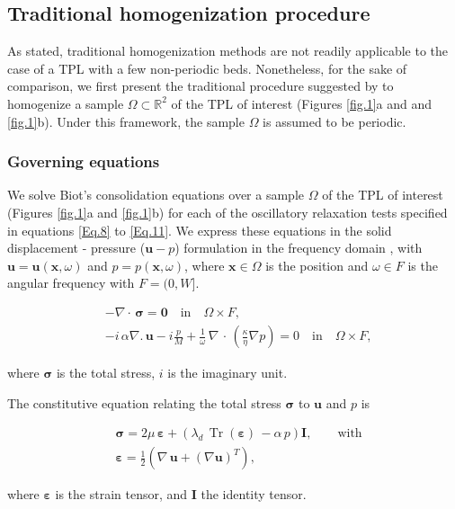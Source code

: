 \documentclass[draft]{agujournal2019}
\DeclareMathOperator{\tr}{Tr}
\begin{document}
\subsection{Traditional homogenization procedure}
As stated, traditional homogenization methods are not readily applicable to the case of a TPL with a few non-periodic beds. Nonetheless, for the sake of comparison, we first present the traditional procedure suggested by  
to homogenize a sample $\Omega \subset \mathbb R^2$ of the TPL of interest (Figures \ref{fig.1}a and and \ref{fig.1}b). Under this framework, the sample $\Omega$ is assumed to be periodic. 

\subsubsection{Governing equations}
We solve Biot's consolidation equations \cite{Biot1941, Biot1962} over a sample  $\Omega$ of the TPL of interest (Figures \ref{fig.1}a and \ref{fig.1}b) for each of the oscillatory relaxation tests specified in equations
\eqref{Eq.8} to \eqref{Eq.11}. We express these equations in the solid displacement - pressure ($\bm{u}-p$) formulation in the frequency domain \cite{Quintal2011,Favino2020},  with $\bm{u} = \bm{u}(\bm{x}, \omega)$ and $p = p(\bm{x},\omega)$, where $\bm{x} \in \Omega$ is the position  and $\omega \in F$ is the angular frequency with $F =(0,W]$. 
\begin{linenomath*}
\begin{equation}\label{Eq.6}
\begin{split}
& - \nabla \cdot \, \bm{\sigma} = \bm{0}  \quad  \textrm{in} \quad \Omega \times F,  \\
& - i \, \alpha \nabla . \, \bm{u} -i \frac{p}{M} + \frac{1}{\omega} \,\nabla \, \cdot \, \left( \frac{\kappa}{\eta} \nabla p\right)  =0 \quad  \textrm{in} \quad \Omega \times F,
\end{split}
\end{equation}
\end{linenomath*}
where $\bm{\sigma}$ is the total stress, $i$ is the imaginary unit.

The constitutive equation relating the total stress $\bm{\sigma}$ to $\bm{u}$ and $p$ is
\begin{linenomath*}
\begin{equation}\label{Eq.7}
\begin{split}
& \bm{\sigma} =  2\mu \, \bm{\varepsilon} +  \left( \lambda_d \,  \tr( \bm{\varepsilon})\, - \alpha \,p \right) \bm{I}, \qquad \text{with}\\
& \bm{\varepsilon} = \frac{1}{2} \left( \nabla \,\bm{u} + ({\nabla  \bm{u}})^T  \right),
 \end{split}
\end{equation}
\end{linenomath*}
where $\bm{\varepsilon}$ is the strain tensor,
and $\bm{I}$ the identity tensor. 
\end{document}
